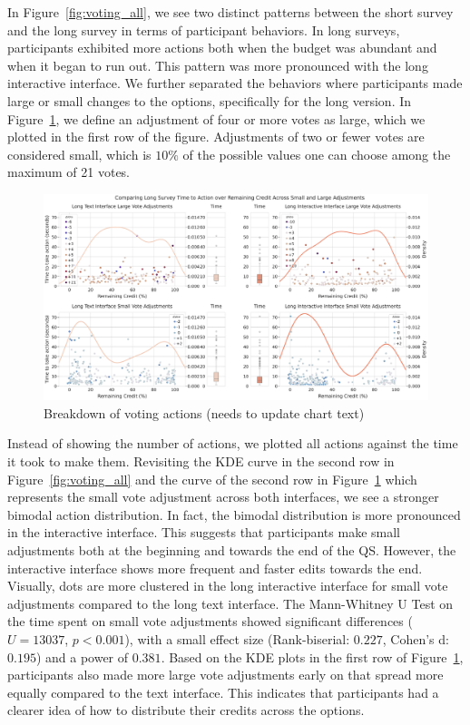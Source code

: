In Figure~\ref{fig:voting_all}, we see two distinct patterns between the short survey and the long survey in terms of participant behaviors. In long surveys, participants exhibited more actions both when the budget was abundant and when it began to run out. This pattern was more pronounced with the long interactive interface. We further separated the behaviors where participants made large or small changes to the options, specifically for the long version. In Figure~\ref{fig:voting_v3_v4}, we define an adjustment of four or more votes as large, which we plotted in the first row of the figure. Adjustments of two or fewer votes are considered small, which is $10\%$ of the possible values one can choose among the maximum of 21 votes.

\begin{figure}[ht]
    \centering
    \includegraphics[width=\textwidth]{content/image/results/combined_density_plots.pdf}
    \caption{Breakdown of voting actions (needs to update chart text)}
    \label{fig:voting_v3_v4}
\end{figure}

Instead of showing the number of actions, we plotted all actions against the time it took to make them. Revisiting the KDE curve in the second row in Figure~\ref{fig:voting_all} and the curve of the second row in Figure~\ref{fig:voting_v3_v4} which represents the small vote adjustment across both interfaces, we see a stronger bimodal action distribution. In fact, the bimodal distribution is more pronounced in the interactive interface. This suggests that participants make small adjustments both at the beginning and towards the end of the QS. However, the interactive interface shows more frequent and faster edits towards the end. Visually, dots are more clustered in the long interactive interface for small vote adjustments compared to the long text interface. The Mann-Whitney U Test on the time spent on small vote adjustments showed significant differences ($U=13037$, $p<0.001$), with a small effect size (Rank-biserial: $0.227$, Cohen's d: $0.195$) and a power of $0.381$. Based on the KDE plots in the first row of Figure~\ref{fig:voting_v3_v4}, participants also made more large vote adjustments early on that spread more equally compared to the text interface. This indicates that participants had a clearer idea of how to distribute their credits across the options.

